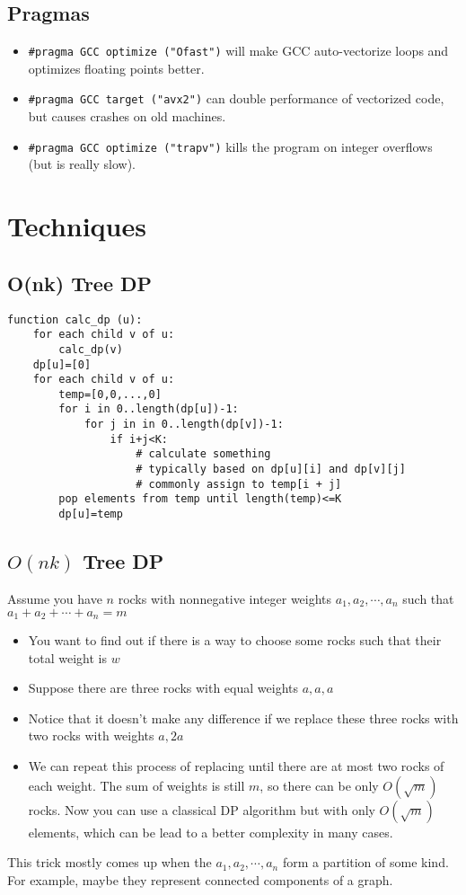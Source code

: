 	\subsection{Pragmas}
		\begin{itemize}
			\item \lstinline{#pragma GCC optimize ("Ofast")} will make GCC auto-vectorize loops and optimizes floating points better.
			\item \lstinline{#pragma GCC target ("avx2")} can double performance of vectorized code, but causes crashes on old machines.
			\item \lstinline{#pragma GCC optimize ("trapv")} kills the program on integer overflows (but is really slow).
		\end{itemize}
\section{Techniques}
	\subsection{O(nk) Tree DP}
\begin{lstlisting}
function calc_dp (u):
	for each child v of u:
		calc_dp(v)
	dp[u]=[0]
	for each child v of u:
		temp=[0,0,...,0]
		for i in 0..length(dp[u])-1:
			for j in in 0..length(dp[v])-1:
				if i+j<K:
					# calculate something 
					# typically based on dp[u][i] and dp[v][j]
					# commonly assign to temp[i + j]
		pop elements from temp until length(temp)<=K
		dp[u]=temp
\end{lstlisting}
\subsection{$O(nk)$ Tree DP}
Assume you have $n$ rocks with nonnegative integer weights $a_1,a_2,\cdots,a_n$ such that $a_1+a_2+\cdots+a_n=m$
\begin{itemize}
\item You want to find out if there is a way to choose some rocks such that their total weight is $w$
\item Suppose there are three rocks with equal weights $a,a,a$
\item Notice that it doesn't make any difference if we replace these three rocks with two rocks with weights $a,2a$
\item We can repeat this process of replacing until there are at most two rocks of each weight. The sum of weights is still $m$,
so there can be only $O(\sqrt{m})$ rocks. Now you can use a classical DP algorithm but with only $O(\sqrt{m})$
elements, which can be lead to a better complexity in many cases.
\end{itemize}
This trick mostly comes up when the $a_1,a_2,\cdots,a_n$ form a partition of some kind. 
For example, maybe they represent connected components of a graph.
